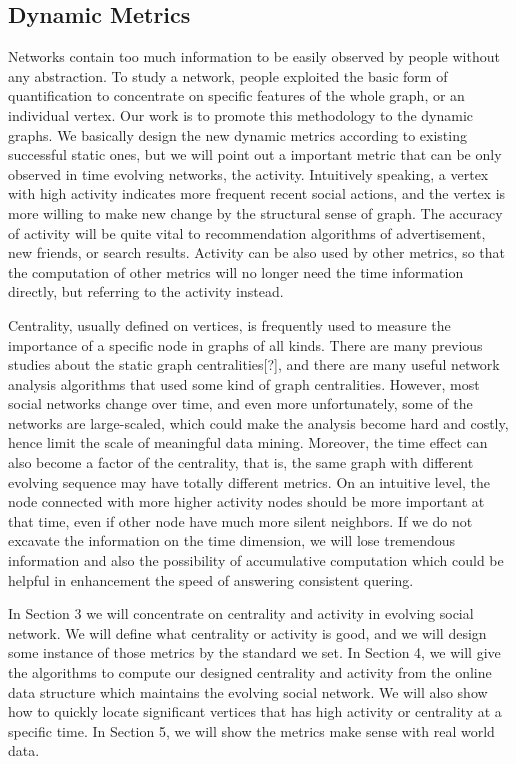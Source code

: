 \documentclass[12pt,abstract=true]{scrartcl}
\numberwithin{equation}{section}
\theoremstyle{definition}   \newtheorem{definition}{Definition}[section]
\theoremstyle{plain}        \newtheorem{theorem}{Theorem}[section]
\theoremstyle{plain}        \newtheorem{observation}{Observation}[section]
\theoremstyle{plain}        \newtheorem{fact}{Fact}[section]
\theoremstyle{plain}        \newtheorem{claim}{Claim}[section]
\theoremstyle{plain}        \newtheorem{lemma}[theorem]{Lemma}
\theoremstyle{plain}        \newtheorem{corollary}[theorem]{Corollary}
\theoremstyle{remark}       \newtheorem{example}{Example}[section]
\theoremstyle{remark}       \newtheorem{remark}{Remark}[section]
\begin{document}
\subsection{Dynamic Metrics}
Networks contain too much information to be easily observed by people without
any abstraction. To study a network, people exploited the basic form of
quantification to concentrate on specific features of the whole graph, or an
individual vertex. Our work is to promote this methodology to the dynamic
graphs. We basically design the new dynamic metrics according to existing
successful static ones, but we will point out a important metric that can be
only observed in time evolving networks, the activity. Intuitively speaking,
a vertex with high activity indicates more frequent recent social actions, and
the vertex is more willing to make new change by the structural sense of graph.
The accuracy of activity will be quite vital to recommendation algorithms of
advertisement, new friends, or search results. Activity can be also used by
other metrics, so that the computation of other metrics will no longer need the
time information directly, but referring to the activity instead.

Centrality, usually defined on vertices, is frequently used to measure the
importance of a specific node in graphs of all kinds. There are many previous
studies about the static graph centralities[?], and there are many useful
network analysis algorithms that used some kind of graph centralities. However,
most social networks change over time, and even more unfortunately, some of the
networks are large-scaled, which could make the analysis become hard and
costly, hence limit the scale of meaningful data mining. Moreover, the time
effect can also become a factor of the centrality, that is, the same graph with
different evolving sequence may have totally different metrics. On an
intuitive level, the node connected with more higher activity nodes should be
more important at that time, even if other node have much more silent
neighbors. If we do not excavate the information on the time dimension, we will
lose tremendous information and also the possibility of accumulative
computation which could be helpful in enhancement the speed of answering
consistent quering.

In Section 3 we will concentrate on centrality and activity in evolving social
network. We will define what centrality or activity is good, and we will design
some instance of those metrics by the standard we set. In Section 4, we will
give the algorithms to compute our designed centrality and activity from the
online data structure which maintains the evolving social network. We will also
show how to quickly locate significant vertices that has high activity or
centrality at a specific time. In Section 5, we will show the metrics make
sense with real world data.
\end{document}
